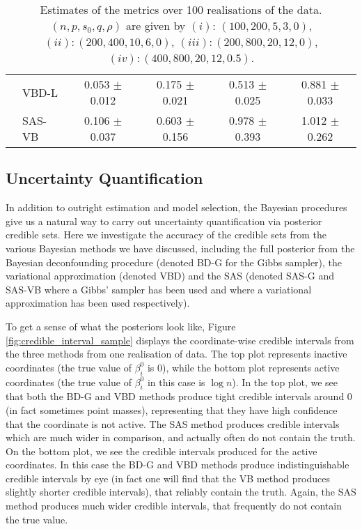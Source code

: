 \documentclass[11pt]{article}
\numberwithin{equation}{section}
\begin{document}
\begin{table}
{\begin{tabular}{r|l|cccc}
              & VBD-L & 0.053 $\pm$ 0.012          & 0.175 $\pm$ 0.021          & 0.513 $\pm$ 0.025          & 0.881 $\pm$ 0.033\\
              & SAS-VB  & 0.106 $\pm$ 0.037          & 0.603 $\pm$ 0.156          & 0.978 $\pm$ 0.393          & 1.012 $\pm$ 0.262\\
\bottomrule
\end{tabular}
}
\caption{Estimates of the metrics over 100 realisations of the data. $(n, p, s_0, q, \rho)$ are given by $(i)$: $(100, 200, 5, 3, 0)$, $(ii): (200, 400, 10, 6, 0)$, $(iii): (200, 800, 20, 12, 0)$, $(iv): (400, 800, 20, 12, 0.5)$.}\label{Tab:large_experiments}
\end{table}

\subsection{Uncertainty Quantification}
In addition to outright estimation and model selection, the Bayesian procedures give us a natural way to carry out uncertainty quantification via posterior credible sets. Here we investigate the accuracy of the credible sets from the various Bayesian methods we have discussed, including the full posterior from the Bayesian deconfounding procedure (denoted BD-G for the Gibbs sampler), the variational approximation (denoted VBD) and the SAS (denoted SAS-G and SAS-VB where a Gibbs' sampler has been used and where a variational approximation has been used respectively). 

To get a sense of what the posteriors look like, Figure \ref{fig:credible_interval_sample} displays the coordinate-wise credible intervals from the three methods from one realisation of data. The top plot represents inactive coordinates (the true value of $\beta_i^0$ is 0), while the bottom plot represents active coordinates (the true value of $\beta_i^0$ in this case is $\log n$). In the top plot, we see that both the BD-G and VBD methods produce tight credible intervals around 0 (in fact sometimes point masses), representing that they have high confidence that the coordinate is not active. The SAS method produces credible intervals which are much wider in comparison, and actually often do not contain the truth. On the bottom plot, we see the credible intervals produced for the active coordinates. In this case the BD-G and VBD methods produce indistinguishable credible intervals by eye (in fact one will find that the VB method produces slightly shorter credible intervals), that reliably contain the truth. Again, the SAS method produces much wider credible intervals, that frequently do not contain the true value.
\end{document}
